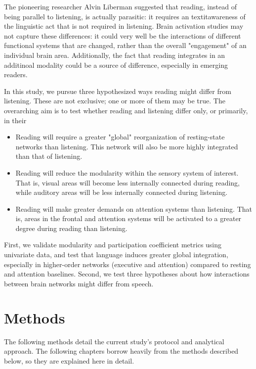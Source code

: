 The pioneering researcher Alvin Liberman suggested that reading, instead of being parallel to listening, is actually parasitic: it requires an textit{awareness} of the linguistic act that is not required in listening. Brain activation studies may not capture these differences: it could very well be the interactions of different functional systems that are changed, rather than the overall "engagement" of an individual brain area. Additionally, the fact that reading integrates in an additinoal modality could be a source of difference, especially in emerging readers. 

In this study, we pursue three hypothesized ways reading might differ from listening. These are not exclusive; one or more of them may be true. The overarching aim is to test whether reading and listening differ only, or primarily, in their 

\begin{itemize}
	\item Reading will require a greater "global" reorganization of resting-state networks than listening. This network will also be more highly integrated than that of listening. 
	\item Reading will reduce the modularity within the sensory system of interest. That is, visual areas will become less internally connected during reading, while auditory areas will be less internally connected during listening.
	\item Reading will make greater demands on attention systems than listening. That is, areas in the frontal and attention systems will be activated to a greater degree during reading than listening.
\end{itemize}

First, we validate modularity and participation coefficient metrics using univariate data, and test that language induces greater global integration, especially in higher-order networks (executive and attention) compared to resting and attention baselines. Second, we test three hypotheses about how interactions between brain networks might differ from speech.


\section{Methods}

The following methods detail the current study's protocol and analytical approach. The following chapters borrow heavily from the methods described below, so they are explained here in detail. 

